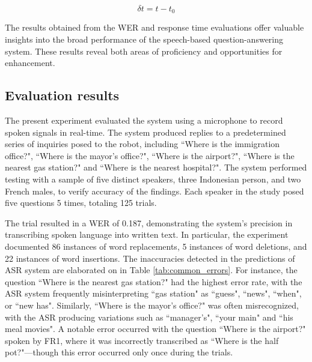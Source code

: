 \documentclass{../styles/svproc}
\begin{document}
\begin{equation}
	\delta{t}=t-t_0
	\label{eq:dt}
\end{equation}

The results obtained from the WER and response time evaluations offer valuable insights into the broad performance of the speech-based question-answering system. These results reveal both areas of proficiency and opportunities for enhancement.

\subsection{Evaluation results}
The present experiment evaluated the system using a microphone to record spoken signals in real-time. The system produced replies to a predetermined series of inquiries posed to the robot, including ``Where is the immigration office?", ``Where is the mayor's office?", ``Where is the airport?", ``Where is the nearest gas station?" and ``Where is the nearest hospital?". The system performed testing with a sample of five distinct speakers, three Indonesian person, and two French males, to verify accuracy of the findings. Each speaker in the study posed five questions 5 times, totaling 125 trials.

The trial resulted in a WER of 0.187, demonstrating the system's precision in transcribing spoken language into written text. In particular, the experiment documented 86 instances of word replacements, 5 instances of word deletions, and 22 instances of word insertions. The inaccuracies detected in the predictions of ASR system are elaborated on in Table \ref{tab:common_errors}. For instance, the question ``Where is the nearest gas station?" had the highest error rate, with the ASR system frequently misinterpreting ``gas station" as ``guess", ``news", ``when", or ``new has". Similarly, ``Where is the mayor's office?" was often misrecognized, with the ASR producing variations such as ``manager's", ``your main" and ``his meal movies". A notable error occurred with the question ``Where is the airport?" spoken by FR1, where it was incorrectly transcribed as ``Where is the half pot?"—though this error occurred only once during the trials.
\end{document}
